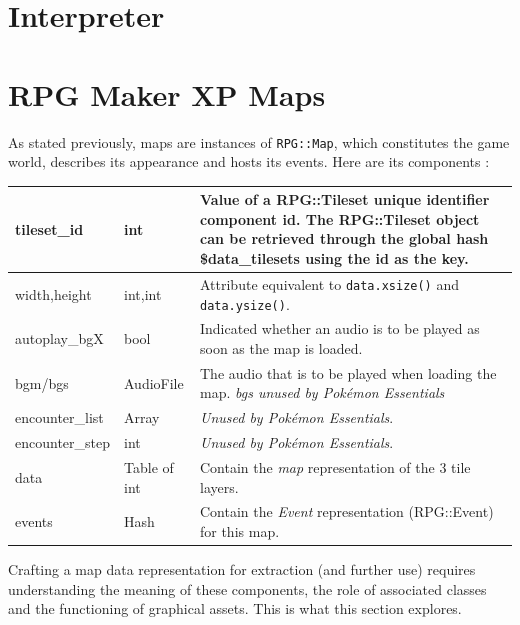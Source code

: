 \documentclass[11pt]{article}
\begin{document}
{\newpage 
\section{Interpreter}



\newpage 
\section{RPG Maker XP Maps}

As stated previously, maps are instances of \verb|RPG::Map|, which constitutes the game world, describes its appearance and hosts its events. Here are its components :

{\small
\begin{tabular}{|a | l | l|}
	\hline
	{\ttfamily tileset\_id} & int & \parbox{.66\linewidth}{\vspace{.2\baselineskip}Value of a {\ttfamily RPG::Tileset} unique identifier component {\ttfamily id}. The {\ttfamily RPG::Tileset} object can be retrieved through the global hash {\ttfamily \$data\_tilesets} using the id as the key.} \\
	\hline
	{\ttfamily width,height} & int,int & Attribute equivalent to \verb|data.xsize()| and \verb|data.ysize()|. \\
	\hline
	{\ttfamily autoplay\_bgX} & bool & Indicated whether an audio is to be played as soon as the map is loaded. \\
	\hline
	{\ttfamily bgm/bgs} & AudioFile & The audio that is to be played when loading the map. \textit{bgs unused by Pokémon Essentials} \\
	\hline
	{\ttfamily encounter\_list} & Array & \textit{Unused by Pokémon Essentials}. \\
	\hline
	{\ttfamily encounter\_step} & int & \textit{Unused by Pokémon Essentials}. \\
	\hline
	{\ttfamily data} & Table of int & Contain the \textit{map} representation of the 3 tile layers. \\
	\hline
	{\ttfamily events} & Hash & Contain the \textit{Event} representation ({\ttfamily RPG::Event}) for this map. \\
	\hline
\end{tabular}}

Crafting a map data representation for extraction (and further use) requires understanding the meaning of these components, the role of associated classes and the functioning of graphical assets. This is what this section explores.


}
\end{document}
